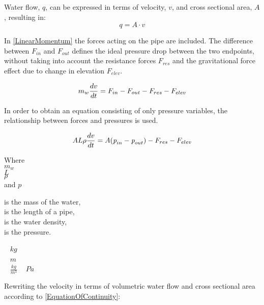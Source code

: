 Water flow, $q$, can be expressed in terms of velocity, $v$, and cross sectional 
area, $A$, resulting in:\\
\begin{equation}
  q=A \cdot v
	\label{EquationOfContinuity}
\end{equation}

 In \eqref{LinearMomentum} the forces acting on the pipe are included. The difference between $F_{in}$ and $F_{out}$ defines the ideal pressure drop between the two endpoints, without taking into account the resistance forces $F_{res}$ and the gravitational force effect due to change in elevation $F_{elev}$.

\begin{equation}
  m_w \frac{dv}{dt} = F_{in} - F_{out} - F_{res} - F_{elev} \\
  \label{LinearMomentum}
\end{equation}

In order to obtain an equation consisting of only pressure variables, the relationship between forces and pressures is used.


 \begin{equation}
    A L \rho \frac{dv}{dt} = A (\textit{p}_{in} - \textit{p}_{out}) - F_{res} - F_{elev} \\
\end{equation}

\begin{minipage}[t]{0.20\textwidth}
Where\\
\hspace*{8mm} $m_w$ \\
\hspace*{8mm} $L$ \\
\hspace*{8mm} $\rho$\\
and \hspace*{0.7mm} $p$ 
\end{minipage}
\begin{minipage}[t]{0.68\textwidth}
\vspace*{2mm}
is the mass of the water,\\
is the length of a pipe,\\
is the water density,\\
is the pressure.
\end{minipage}
\begin{minipage}[t]{0.10\textwidth}
\vspace*{2mm}
\textcolor{White}{te}$\unit{kg}$\\
\textcolor{White}{te}$\unit{m}$\\
\textcolor{White}{te}$\unit{\frac{kg}{m^{3}}}$
\textcolor{White}{te}$\unit{Pa}$\\
\end{minipage}
%
Rewriting the velocity in terms of volumetric water flow and cross sectional 
area according to \eqref{EquationOfContinuity}:

